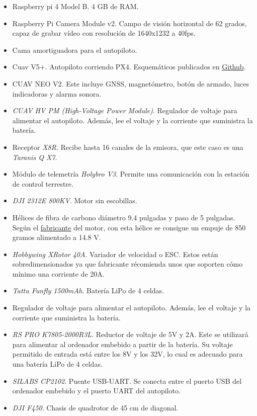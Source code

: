 \begin{itemize}
\item Raspberry pi 4 Model B. 4 GB de RAM. 
\item Raspberry Pi Camera Module v2. Campo de visión horizontal de 62 grados, capaz de grabar vídeo con resolución de 1640x1232 a 40fps.
\item Cama amortiguadora para el autopiloto.
\item Cuav V5+. Autopiloto corriendo PX4. Esquemáticos publicados en \href{https://github.com/ArduPilot/Schematics/tree/master/CUAV/V5_Autopilot/V5\%2B}{Github}.
\item CUAV NEO V2. Este incluye GNSS, magnetómetro, botón de armado, luces indicadoras y alarma sonora.
\item \textit{CUAV HV PM (High-Voltage Power Module)}. Regulador de voltaje para alimentar el autopiloto. Además, lee el voltaje y la corriente que suministra la batería. 
\item Receptor \textit{X8R}. Recibe hasta 16 canales de la emisora, que este caso es una \textit{Taranis Q X7}. 
\item Módulo de telemetría \textit{Holybro V3}. Permite una comunicación con la estación de control terrestre.
\item \textit{DJI 2312E 800KV}. Motor sin escobillas.
\item Hélices de fibra de carbono diámetro 9.4 pulgadas y paso de 5 pulgadas. Según el \href{https://www.dji.com/e305/spec}{fabricante} del motor, con esta hélice se consigue un empuje de 850 gramos alimentado a 14.8 V.
\item \textit{Hobbywing XRotor 40A}. Variador de velocidad o ESC. Estos están sobredimensionados ya que fabricante récomienda unos que soporten cómo mínimo una corriente de 20A.
\item \textit{Tattu Funfly 1500mAh}. Batería LiPo de 4 celdas.
\item Regulador de voltaje para alimentar el autopiloto. Además, lee el voltaje y la corriente que suministra la batería. 
\item \textit{RS PRO K7805-2000R3L}. Reductor de voltaje de 5V y 2A. Este se utilizará para alimentar al ordenador embebido a partir de la batería. Su voltaje permitido de entrada está entre los 8V y los 32V, lo cual es adecuado para una batería LiPo de 4 celdas. 
\item \textit{SILABS CP2102}. Puente USB-UART. Se conecta entre el puerto USB del ordenador embebido y el puerto UART del autopiloto.
\item \textit{DJI F450}. Chasis de quadrotor de 45 cm de diagonal. 

\end{itemize}
